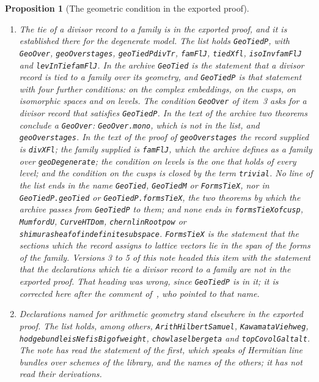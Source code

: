 \documentclass[11pt]{article}
\newtheorem{proposition}[theorem]{Proposition}
\theoremstyle{definition}
\theoremstyle{remark}
\DeclareRobustCommand{\lean}[1]{{\renewcommand{\_}{\textunderscore\allowbreak}\texttt{#1}}}
\begin{document}
\begin{proposition}[The geometric condition in the exported proof]
\begin{enumerate}[leftmargin=2em,itemsep=1pt]
\item \emph{The tie of a divisor record to a family is in the exported proof, and it is established there for the degenerate model.} The list holds \lean{GeoTiedP}, with \lean{GeoOver}, \lean{geoOver\_stages}, \lean{geoTiedP\_divTr}, \lean{famFlJ}, \lean{tiedX\_fl}, \lean{isoInv\_famFlJ} and \lean{levInTie\_famFlJ}. In the archive \lean{GeoTied} is the statement that a divisor record is tied to a family over its geometry, and \lean{GeoTiedP} is that statement with four further conditions: on the complex embeddings, on the cusps, on isomorphic spaces and on levels. The condition \lean{GeoOver} of item~3 asks for a divisor record that satisfies \lean{GeoTiedP}. In the text of the archive two theorems conclude a \lean{GeoOver}: \lean{GeoOver.mono}, which is not in the list, and \lean{geoOver\_stages}. In the text of the proof of \lean{geoOver\_stages} the record supplied is \lean{divXFl}; the family supplied is \lean{famFlJ}, which the archive defines as a family over \lean{geoDegenerate}; the condition on levels is the one that holds of every level; and the condition on the cusps is closed by the term \lean{trivial}. No line of the list ends in the name \lean{GeoTied}, \lean{GeoTiedM} or \lean{FormsTieX}, nor in \lean{GeoTiedP.geoTied} or \lean{GeoTiedP.formsTieX}, the two theorems by which the archive passes from \lean{GeoTiedP} to them; and none ends in \lean{formsTieX\_of\_cusp}, \lean{MumfordU}, \lean{CurveHTDom}, \lean{chern\_linRoot\_pow} or \lean{shimura\_sheaf\_of\_indefinite\_subspace}. \lean{FormsTieX} is the statement that the sections which the record assigns to lattice vectors lie in the span of the forms of the family. Versions 3 to 5 of this note headed this item with the statement that the declarations which tie a divisor record to a family are not in the exported proof. That heading was wrong, since \lean{GeoTiedP} is in it; it is corrected here after the comment of~\citet{dixitcomment}, who pointed to that name.
\item \emph{Declarations named for arithmetic geometry stand elsewhere in the exported proof.} The list holds, among others, \lean{ArithHilbertSamuel}, \lean{KawamataViehweg}, \lean{hodge\_bundle\_isNef\_isBig\_of\_weight}, \lean{chowla\_selberg\_eta} and \lean{topCovolG\_alt\_alt}. The note has read the statement of the first, which speaks of Hermitian line bundles over schemes of the library, and the names of the others; it has not read their derivations.
\end{enumerate}
\end{proposition}
\end{document}

